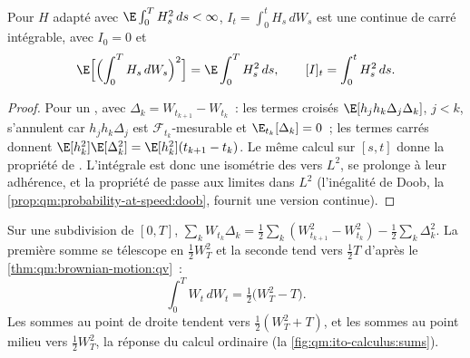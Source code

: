\begin{theorem}\label{thm:qm:ito-calculus:isometry}
Pour $H$ adapté avec $\E\int_0^T H_s^2\,ds < \infty$, $I_t = \int_0^t H_s\,dW_s$ est une
 continue de carré intégrable, avec $I_0 = 0$ et
\[
\E\Bigl[\Bigl(\int_0^T H_s\,dW_s\Bigr)^2\Bigr] = \E\int_0^T H_s^2\,ds, \qquad [I]_t = \int_0^t H_s^2\,ds.
\]
\end{theorem}

\begin{proof}
Pour un , avec $\Delta_k = W_{t_{k+1}} - W_{t_k}$~: les termes croisés $\E[h_jh_k\Delta_j\Delta_k]$,
$j < k$, s'annulent car $h_jh_k\Delta_j$ est $\mathcal F_{t_k}$-mesurable et $\E_{t_k}[\Delta_k] = 0$~;
les termes carrés donnent $\E[h_k^2]\E[\Delta_k^2] = \E[h_k^2](t_{k+1} - t_k)$. Le même calcul sur
$[s, t]$ donne la propriété de . L'intégrale est donc une isométrie des 
vers $L^2$, se prolonge à leur adhérence, et la propriété de  passe aux
limites dans $L^2$ (l'inégalité de Doob, la \cref{prop:qm:probability-at-speed:doob}, fournit une
version continue).
\end{proof}

\begin{example}\label{ex:qm:ito-calculus:wdw}
Sur une subdivision de $[0, T]$, $\sum_k W_{t_k}\Delta_k = \tfrac12\sum_k(W_{t_{k+1}}^2 - W_{t_k}^2) -
\tfrac12\sum_k\Delta_k^2$. La première somme se télescope en $\tfrac12 W_T^2$ et la seconde tend vers
$\tfrac12 T$ d'après le \cref{thm:qm:brownian-motion:qv}~:
\[
\int_0^T W_t\,dW_t = \tfrac12\bigl(W_T^2 - T\bigr).
\]
Les sommes au point de droite tendent vers $\tfrac12(W_T^2 + T)$, et les sommes au point milieu vers $\tfrac12W_T^2$, la
réponse du calcul ordinaire (la \cref{fig:qm:ito-calculus:sums}).
\end{example}

